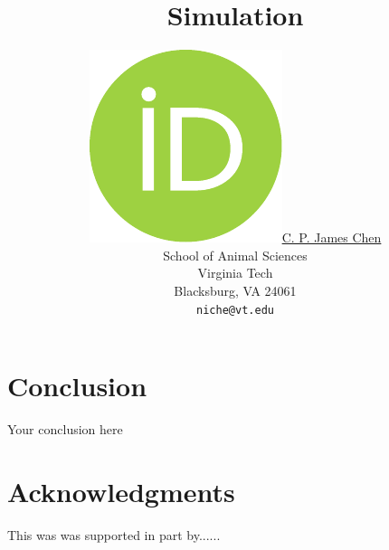 \documentclass{article}
\title{Simulation}
\author{
	\href{https://orcid.org/0000-0000-0000-0000}{\includegraphics[scale=0.06]{orcid.pdf}\hspace{1mm}C. P. James Chen} \\
	School of Animal Sciences\\
	Virginia Tech\\
	Blacksburg, VA 24061 \\
	\texttt{niche@vt.edu}
}
\begin{document}
\maketitle








\section{Conclusion}
Your conclusion here

\section*{Acknowledgments}
This was was supported in part by......




\newpage

\end{document}
